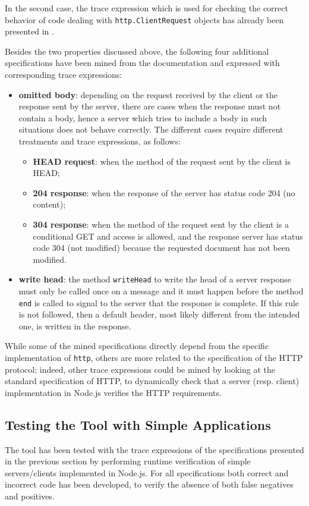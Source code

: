 In the second case, the trace expression which is used for checking the correct behavior of code dealing with
\lstinline{http.ClientRequest} objects has already been presented in .

Besides the two properties discussed above, the following four additional specifications have been mined from
the documentation and expressed with corresponding trace expressions:
\begin{itemize}
\item \textbf{omitted body}: depending on the request received by the client or the response sent by the server, there are cases when the response must not
  contain a body, hence
  a server which tries to include a body in such situations does not behave correctly. The different cases require
  different treatments and trace expressions, as follows:
  \begin{itemize}
  \item \textbf{HEAD request}: when the method of the request sent by the client is HEAD;
  \item \textbf{204 response}: when the response of the server has status code 204 (no content);
  \item \textbf{304 response}: when the method of the request sent by the client is a conditional GET and access is allowed, and the response
    server has status code 304 (not modified) because the requested document has not been modified.
  \end{itemize}
\item \textbf{write head}: the method \lstinline{writeHead} to write the head of a server response must only be called once on a message and it must happen before
  the method \lstinline{end} is called to signal to the server that the response is complete. If this rule is not followed, then
  a default header, most likely different from the intended one, is written in the response.
\end{itemize}
While some of the mined specifications directly depend from the specific implementation of \lstinline{http}, others
are more related to the specification of the HTTP protocol; indeed, other trace expressions could be mined by looking at the
standard specification of HTTP, to dynamically check that a server (resp. client) implementation in Node.js verifies the HTTP
requirements.

\subsection{Testing the Tool with Simple Applications}
\label{sec:simple-test}
The tool has been tested with the trace expressions of the specifications presented in the previous section by performing
runtime verification of simple servers/clients implemented in Node.js.
For all specifications both correct and incorrect code has been developed, to verify the absence of both false negatives and positives.

